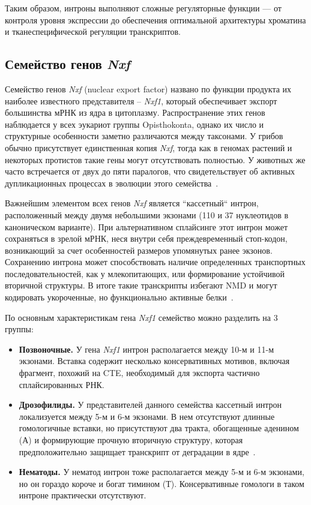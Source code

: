 Таким образом, интроны выполняют сложные регуляторные функции — от контроля уровня экспрессии до обеспечения оптимальной архитектуры хроматина и тканеспецифической регуляции транскриптов.


\subsection{Семейство генов \textit{Nxf}}

Семейство генов \textit{Nxf} (nuclear export factor) названо по функции продукта их наиболее известного представителя – \textit{Nxf1}, который обеспечивает экспорт большинства мРНК из ядра в цитоплазму.
Распространение этих генов наблюдается у всех эукариот группы Opisthokonta, однако их число и структурные особенности заметно различаются между таксонами.
У грибов обычно присутствует единственная копия \textit{Nxf}, тогда как в геномах растений и некоторых протистов такие гены могут отсутствовать полностью.
У животных же часто встречается от двух до пяти паралогов, что свидетельствует об активных дупликационных процессах в эволюции этого семейства~\cite{Mamon2013}.

Важнейшим элементом всех генов \textit{Nxf} является ``кассетный`` интрон, расположенный между двумя небольшими экзонами (110 и 37 нуклеотидов в каноническом варианте).
При альтернативном сплайсинге этот интрон может сохраняться в зрелой мРНК, неся внутри себя преждевременный стоп-кодон, возникающий за счет особенностей размеров упомянутых ранее экзонов.
Сохранению интрона может способствовать наличие определенных транспортных последовательностей, как у млекопитающих, или формирование устойчивой вторичной структуры.
В итоге такие транскрипты избегают NMD и могут кодировать укороченные, но функционально активные белки~\cite{Mamon2013,Golubkova2012}.

По основным характеристикам гена \textit{Nxf1} семейство можно разделить на 3 группы:

\begin{itemize}
  \item \textbf{Позвоночные.} У гена \textit{Nxf1} интрон располагается между 10-м и 11-м экзонами. Вставка содержит несколько консервативных мотивов, включая фрагмент, похожий на CTE, необходимый для экспорта частично сплайсированных РНК.
  \item \textbf{Дрозофилиды.} У представителей данного семейства кассетный интрон локализуется между 5-м и 6-м экзонами. В нем отсутствуют длинные гомологичные вставки, но присутствуют два тракта, обогащенные аденином (А) и формирующие прочную вторичную структуру, которая предположительно защищает транскрипт от деградации в ядре~\cite{Mamon2013}.
  \item \textbf{Нематоды.} У нематод интрон тоже располагается между 5-м и 6-м экзонами, но он гораздо короче и богат тимином (Т). Консервативные гомологи в таком интроне практически отсутствуют.
\end{itemize}


